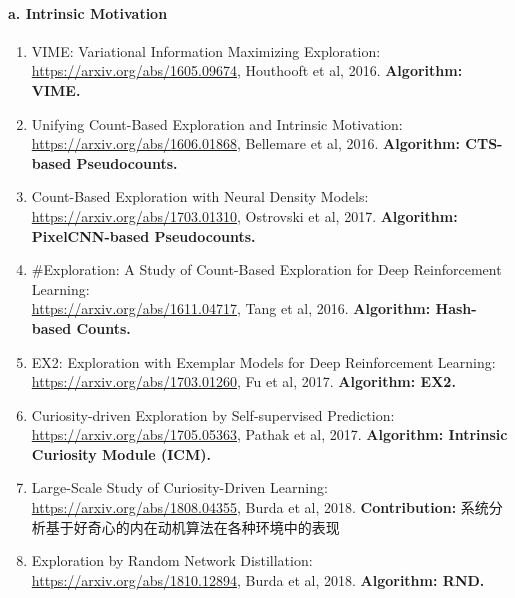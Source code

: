 \documentclass[lang=cn,11pt,a4paper]{elegant_template}
\begin{document}
\paragraph{a. Intrinsic Motivation}
\begin{enumerate}
    \item VIME: Variational Information Maximizing Exploration:\\ \href{https://arxiv.org/abs/1605.09674}{https://arxiv.org/abs/1605.09674}, Houthooft et al, 2016. \textbf{Algorithm: VIME.}
    \item Unifying Count-Based Exploration and Intrinsic Motivation:\\ \href{https://arxiv.org/abs/1606.01868}{https://arxiv.org/abs/1606.01868}, Bellemare et al, 2016. \textbf{Algorithm: CTS-based Pseudocounts.}
    \item Count-Based Exploration with Neural Density Models:\\ \href{https://arxiv.org/abs/1703.01310}{https://arxiv.org/abs/1703.01310}, Ostrovski et al, 2017. \textbf{Algorithm: PixelCNN-based Pseudocounts.}
    \item \#Exploration: A Study of Count-Based Exploration for Deep Reinforcement Learning:\\ \href{https://arxiv.org/abs/1611.04717}{https://arxiv.org/abs/1611.04717}, Tang et al, 2016. \textbf{Algorithm: Hash-based Counts.}
    \item EX2: Exploration with Exemplar Models for Deep Reinforcement Learning:\\ \href{https://arxiv.org/abs/1703.01260}{https://arxiv.org/abs/1703.01260}, Fu et al, 2017. \textbf{Algorithm: EX2.}
    \item Curiosity-driven Exploration by Self-supervised Prediction:\\ \href{https://arxiv.org/abs/1705.05363}{https://arxiv.org/abs/1705.05363}, Pathak et al, 2017. \textbf{Algorithm: Intrinsic Curiosity Module (ICM).}
    \item Large-Scale Study of Curiosity-Driven Learning:\\ \href{https://arxiv.org/abs/1808.04355}{https://arxiv.org/abs/1808.04355}, Burda et al, 2018. \textbf{Contribution:} 系统分析基于好奇心的内在动机算法在各种环境中的表现
    \item Exploration by Random Network Distillation:\\ \href{https://arxiv.org/abs/1810.12894}{https://arxiv.org/abs/1810.12894}, Burda et al, 2018. \textbf{Algorithm: RND.}
\end{enumerate}
\end{document}
